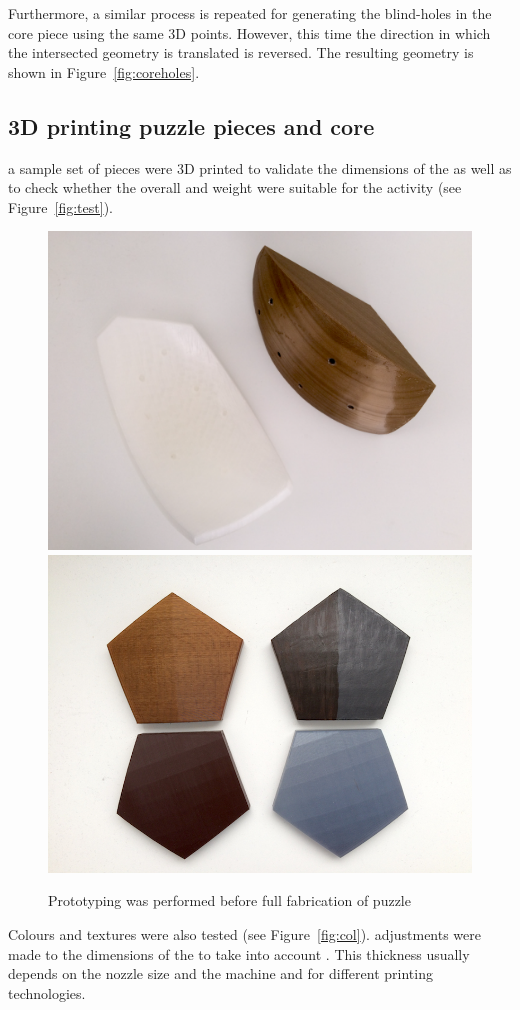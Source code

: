 \documentclass[acmlarge,screen,dvipsnames]{acmart}
\begin{document}
Furthermore, a similar process is repeated for generating the
blind-holes in the  core piece using the same 3D points. However, this
time the direction in which the intersected geometry is translated is
reversed. The resulting geometry is shown in
Figure~\ref{fig:coreholes}. %

\subsection{3D printing puzzle pieces and core}
 a sample set of pieces were 3D
printed to validate the dimensions of the  as well as to check
whether the overall  and weight were suitable for the
 activity (see Figure~\ref{fig:test}).
%
\begin{figure}[htb]
  \centering
  {\includegraphics[width=0.445\linewidth]{images/coreANDpiece}}
   {\includegraphics[width=0.446\linewidth]{images/colour}}

  \caption{
    Prototyping was performed before full fabrication of puzzle}
\end{figure}
%
Colours and textures were also tested (see Figure~\ref{fig:col}). 
adjustments were made to the dimensions of the  to take into
account . This
thickness usually depends on the nozzle size and the machine and  for different printing technologies.
%
\end{document}
